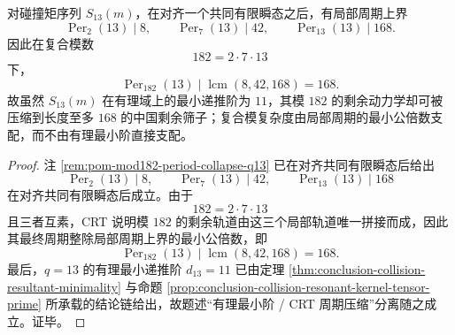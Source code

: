 \begin{theorem}[\texorpdfstring{$q=13$}{q=13} 的中国剩余审计压缩]\label{thm:conclusion-q13-crt-period-compression}
对碰撞矩序列 \(S_{13}(m)\)，在对齐一个共同有限瞬态之后，有局部周期上界
\[
\operatorname{Per}_2(13)\mid 8,
\qquad
\operatorname{Per}_7(13)\mid 42,
\qquad
\operatorname{Per}_{13}(13)\mid 168.
\]
因此在复合模数
\[
182=2\cdot 7\cdot 13
\]
下，
\[
\operatorname{Per}_{182}(13)\mid \operatorname{lcm}(8,42,168)=168.
\]
故虽然 \(S_{13}(m)\) 在有理域上的最小递推阶为 \(11\)，其模 \(182\) 的剩余动力学却可被压缩到长度至多 \(168\) 的中国剩余筛子；复合模复杂度由局部周期的最小公倍数支配，而不由有理最小阶直接支配。
\end{theorem}
\begin{proof}
注 \ref{rem:pom-mod182-period-collapse-q13} 已在对齐共同有限瞬态后给出
\[
\operatorname{Per}_2(13)\mid 8,
\qquad
\operatorname{Per}_7(13)\mid 42,
\qquad
\operatorname{Per}_{13}(13)\mid 168
\]
在对齐共同有限瞬态后成立。由于
\[
182=2\cdot 7\cdot 13
\]
且三者互素，CRT 说明模 \(182\) 的剩余轨道由这三个局部轨道唯一拼接而成，因此其最终周期整除局部周期上界的最小公倍数，即
\[
\operatorname{Per}_{182}(13)\mid \operatorname{lcm}(8,42,168)=168.
\]
最后，\(q=13\) 的有理最小递推阶 \(d_{13}=11\) 已由定理 \ref{thm:conclusion-collision-resultant-minimality} 与命题 \ref{prop:conclusion-collision-resonant-kernel-tensor-prime} 所承载的结论链给出，故题述“有理最小阶 / CRT 周期压缩”分离随之成立。证毕。
\end{proof}
